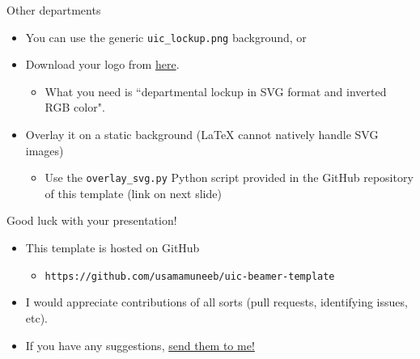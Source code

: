 \documentclass{beamer}
\newcommand{\hrefcol}[2]{\textcolor{uihteal}{\href{#1}{#2}}}
\begin{document}
\begin{frame}[fragile]{Other departments}
\begin{itemize}
\item You can use the generic \verb|uic_lockup.png| background, or
\item Download your logo from \hrefcol{https://marketing.uic.edu/marketing-toolbox/university-style-guide/university-marks-logos/}{here}.
    \begin{itemize}
    \item What you need is ``departmental lockup in SVG format and inverted RGB color".
    \end{itemize}
\item Overlay it on a static background (LaTeX cannot natively handle SVG images)
    \begin{itemize}
    \item Use the \verb|overlay_svg.py| Python script provided in the GitHub repository of this template (link on next slide)
    \end{itemize}
\end{itemize}
\end{frame}


\begin{frame}[fragile]{Good luck with your presentation!}
\begin{itemize}
\item This template is hosted on GitHub
    \begin{itemize}
    \item  \verb|https://github.com/usamamuneeb/uic-beamer-template|
    \end{itemize}
\item  I would appreciate contributions of all sorts (pull requests, identifying issues, etc).
\item  If you have any suggestions,
\hrefcol{mailto:umunee2@uic.edu}{send them to me!}
\end{itemize}
\end{frame}


\backmatter
\end{document}
